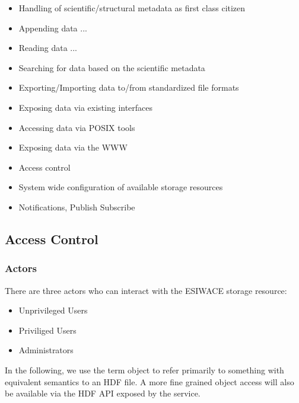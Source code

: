 \documentclass{../../template/esiwace-report}
\begin{document}
\begin{itemize}
\item Handling of scientific/structural metadata as first class citizen
\item Appending data ...
\item Reading data ...
\item Searching for data based on the scientific metadata
\item Exporting/Importing data to/from standardized file formats
\item Exposing data via existing interfaces
\item Accessing data via POSIX tools
\item Exposing data via the WWW
\item Access control
\item System wide configuration of available storage resources
\item Notifications, Publish Subscribe
\end{itemize}





\subsection{Access Control}


\subsubsection{Actors}

There are three actors who can interact with the ESIWACE storage resource:
\begin{itemize}
\item Unprivileged Users
\item Priviliged Users
\item Administrators
\end{itemize}

In the following, we use the term object to refer primarily to something with equivalent semantics to an HDF file. A more fine grained object access will also be available via the HDF API exposed by the service.
\end{document}
